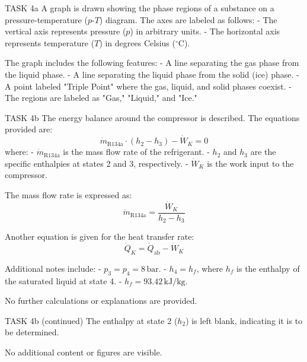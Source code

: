 TASK 4a  
A graph is drawn showing the phase regions of a substance on a pressure-temperature (\(p\)-\(T\)) diagram. The axes are labeled as follows:  
- The vertical axis represents pressure (\(p\)) in arbitrary units.  
- The horizontal axis represents temperature (\(T\)) in degrees Celsius (\(^\circ\text{C}\)).  

The graph includes the following features:  
- A line separating the gas phase from the liquid phase.  
- A line separating the liquid phase from the solid (ice) phase.  
- A point labeled "Triple Point" where the gas, liquid, and solid phases coexist.  
- The regions are labeled as "Gas," "Liquid," and "Ice."  

TASK 4b  
The energy balance around the compressor is described. The equations provided are:  
\[
\dot{m}_{\text{R134a}} \cdot (h_2 - h_3) - \dot{W}_K = 0
\]
where:  
- \( \dot{m}_{\text{R134a}} \) is the mass flow rate of the refrigerant.  
- \( h_2 \) and \( h_3 \) are the specific enthalpies at states 2 and 3, respectively.  
- \( \dot{W}_K \) is the work input to the compressor.  

The mass flow rate is expressed as:  
\[
\dot{m}_{\text{R134a}} = \frac{\dot{W}_K}{h_2 - h_3}
\]

Another equation is given for the heat transfer rate:  
\[
\dot{Q}_K = \dot{Q}_{\text{ab}} - \dot{W}_K
\]

Additional notes include:  
- \( p_3 = p_4 = 8 \, \text{bar} \).  
- \( h_4 = h_f \), where \( h_f \) is the enthalpy of the saturated liquid at state 4.  
- \( h_f = 93.42 \, \text{kJ/kg} \).  

No further calculations or explanations are provided.  

TASK 4b (continued)  
The enthalpy at state 2 (\( h_2 \)) is left blank, indicating it is to be determined.  

No additional content or figures are visible.